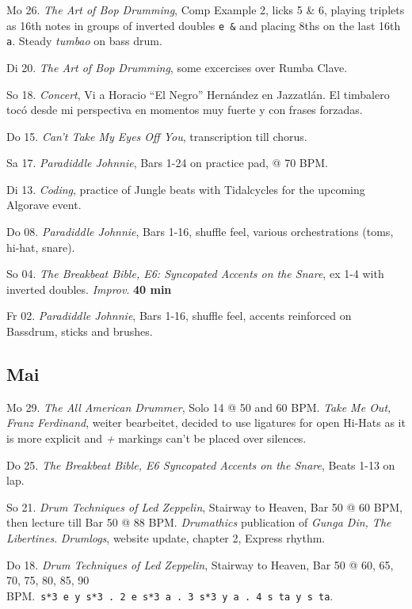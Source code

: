 \documentclass[
]{book}
\begin{document}
Mo 26. \emph{The Art of Bop Drumming}, Comp Example 2, licks 5 \& 6, playing triplets as 16th notes in groups of inverted doubles \texttt{e\ \&} and placing 8ths on the last 16th \texttt{a}. Steady \emph{tumbao} on bass drum.

\label{jun262023}

Di 20. \emph{The Art of Bop Drumming}, some excercises over Rumba Clave.

So 18. \emph{Concert}, Vi a Horacio ``El Negro'' Hernández en Jazzatlán. El timbalero tocó desde mi perspectiva en momentos muy fuerte y con frases forzadas.

Do 15. \emph{Can't Take My Eyes Off You}, transcription till chorus.

Sa 17. \emph{Paradiddle Johnnie}, Bars 1-24 on practice pad, @ 70 BPM.

Di 13. \emph{Coding}, practice of Jungle beats with Tidalcycles for the upcoming Algorave event.

Do 08. \emph{Paradiddle Johnnie}, Bars 1-16, shuffle feel, various orchestrations (toms, hi-hat, snare).

So 04. \emph{The Breakbeat Bible, E6: Syncopated Accents on the Snare}, ex 1-4 with inverted doubles. \emph{Improv}. \textbf{40 min}

Fr 02. \emph{Paradiddle Johnnie}, Bars 1-16, shuffle feel, accents reinforced on Bassdrum, sticks and brushes.

\subsection*{Mai}\label{mai-2023}

Mo 29. \emph{The All American Drummer}, Solo 14 @ 50 and 60 BPM. \emph{Take Me Out, Franz Ferdinand}, weiter bearbeitet, decided to use ligatures for open Hi-Hats as it is more explicit and \emph{+} markings can't be placed over silences.

Do 25. \emph{The Breakbeat Bible, E6 Syncopated Accents on the Snare}, Beats 1-13 on lap.

So 21. \emph{Drum Techniques of Led Zeppelin}, Stairway to Heaven, Bar 50 @ 60 BPM, then lecture till Bar 50 @ 88 BPM. \emph{Drumathics} publication of \emph{Gunga Din, The Libertines}. \emph{Drumlogs}, website update, chapter 2, Express rhythm.

Do 18. \emph{Drum Techniques of Led Zeppelin}, Stairway to Heaven, Bar 50 @ 60, 65, 70, 75, 80, 85, 90 BPM.~\texttt{s*3\ e\ y\ s*3\ .\ 2\ e\ s*3\ a\ .\ 3\ s*3\ y\ a\ .\ 4\ s\ ta\ y\ s\ ta}.
\end{document}
